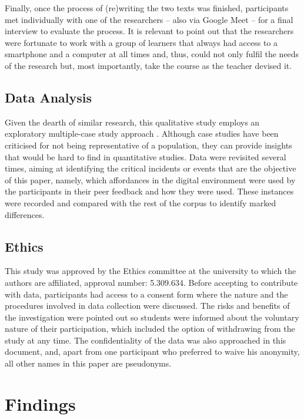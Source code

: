 \documentclass[english]{textolivre}
\begin{document}
Finally, once the process of (re)writing the two texts was finished, participants met individually with one of the researchers – also via Google Meet – for a final interview to evaluate the process. It is relevant to point out that the researchers were fortunate to work with a group of learners that always had access to a smartphone and a computer at all times and, thus, could not only fulfil the needs of the research but, most importantly, take the course as the teacher devised it.


\subsection{Data Analysis}

Given the dearth of similar research, this qualitative study employs an exploratory multiple-case study approach \cite{cohen2018research}. Although case studies have been criticised for not being representative of a population, they can provide insights that would be hard to find in quantitative studies. Data were revisited several times, aiming at identifying the critical incidents or events that are the objective of this paper, namely, which affordances in the digital environment were used by the participants in their peer feedback and how they were used. These instances were recorded and compared with the rest of the corpus to identify marked differences.


\subsection{Ethics}

This study was approved by the Ethics committee at the university to which the authors are affiliated, approval number: 5.309.634. Before accepting to contribute with data, participants had access to a consent form where the nature and the procedures involved in data collection were discussed. The risks and benefits of the investigation were pointed out so students were informed about the voluntary nature of their participation, which included the option of withdrawing from the study at any time. The confidentiality of the data was also approached in this document, and, apart from one participant who preferred to waive his anonymity, all other names in this paper are pseudonyms.


\section{Findings}
\end{document}
